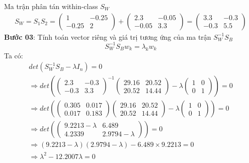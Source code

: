 \documentclass{article}
\begin{document}
	Ma trận phân tán within-class $S_W$
	\begin{gather*}
		S_W = S_1 S_2 = \begin{pmatrix}1 & -0.25\\-0.25 & 2\end{pmatrix} + \begin{pmatrix}2.3 & -0.05\\-0.05 & 3.3\end{pmatrix} = \begin{pmatrix}3.3 & -0.3\\-0.3 & 5.5\end{pmatrix}
	\end{gather*}
	\textbf{Bước 03}: Tính toán vector riêng và giá trị tương ứng của ma trận $S_W^{-1}S_B$
	$$S_W^{-1}S_Bw_k = \lambda_kw_k$$
	Ta có:
	\begin{gather*}
		det(S_W^{-1}S_B - \lambda I_n) = 0\\
		\Rightarrow det\left(\begin{pmatrix}2.3 & -0.3\\-0.3 & 3.3\end{pmatrix}^{-1} \begin{pmatrix}29.16 & 20.52\\20.52 & 14.44\end{pmatrix} - \lambda\begin{pmatrix}1 & 0\\0 & 1\end{pmatrix}\right) = 0\\
		\Rightarrow det\left(\begin{pmatrix}0.305 & 0.017\\0.017 & 0.183\end{pmatrix}\begin{pmatrix}29.16 & 20.52\\20.52 & 14.44\end{pmatrix} - \lambda\begin{pmatrix}1 & 0\\0 & 1\end{pmatrix}\right) = 0\\
		\Rightarrow det\left(\begin{pmatrix}9.2213 - \lambda & 6.489\\ 4.2339 & 2.9794 - \lambda\end{pmatrix}\right) = 0\\
		\Rightarrow (9.2213 - \lambda)(2.9794 - \lambda) - 6.489 \times 9.2213 = 0\\
		\Rightarrow \lambda^2 - 12.2007\lambda = 0
	\end{gather*}
\end{document}
